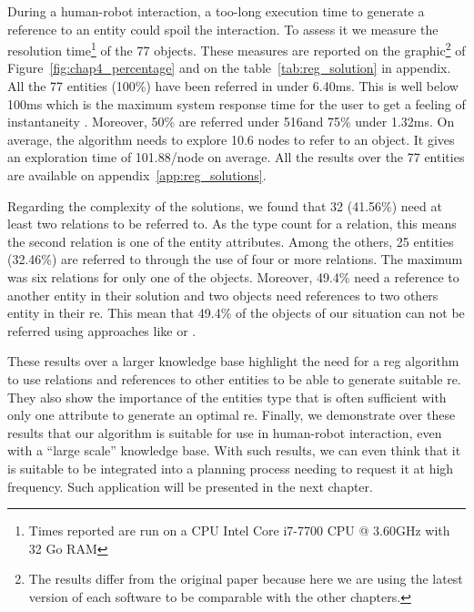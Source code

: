 During a human-robot interaction, a too-long execution time to generate a reference to an entity could spoil the interaction. To assess it we measure the resolution time\footnote{Times reported are run on a CPU Intel Core i7-7700 CPU @ 3.60GHz with 32 Go RAM} of the 77 objects. These measures are reported on the graphic\footnote{The results differ from the original paper because here we are using the latest version of each software to be comparable with the other chapters.} of Figure~\ref{fig:chap4_percentage} and on the table~\ref{tab:reg_solution} in appendix. All the 77 entities (100\%) have been referred in under 6.40ms. This is well below 100ms which is the maximum system response time for the user to get a feeling of instantaneity \cite{miller_1968_response}. Moreover, 50\% are referred under 516\us and 75\% under 1.32ms. On average, the algorithm needs to explore 10.6 nodes to refer to an object. It gives an exploration time of 101.88\us/node on average. All the results over the 77 entities are available on appendix~\ref{app:reg_solutions}.

Regarding the complexity of the solutions, we found that 32 (41.56\%) need at least two relations to be referred to. As the type count for a relation, this means the second relation is one of the entity attributes. Among the others, 25 entities (32.46\%) are referred to through the use of four or more relations. The maximum was six relations for only one of the objects. Moreover, 49.4\% need a reference to another entity in their solution and two objects need references to two others entity in their \acrshort{re}. This mean that 49.4\% of the objects of our situation can not be referred using approaches like \cite{ros_2010_which} or \cite{dale_1995_computational}.

These results over a larger knowledge base highlight the need for a \acrshort{reg} algorithm to use relations and references to other entities to be able to generate suitable \acrshort{re}. They also show the importance of the entities type that is often sufficient with only one attribute to generate an optimal \acrshort{re}. Finally, we demonstrate over these results that our algorithm is suitable for use in human-robot interaction, even with a ``large scale'' knowledge base. With such results, we can even think that it is suitable to be integrated into a planning process needing to request it at high frequency. Such application will be presented in the next chapter.



